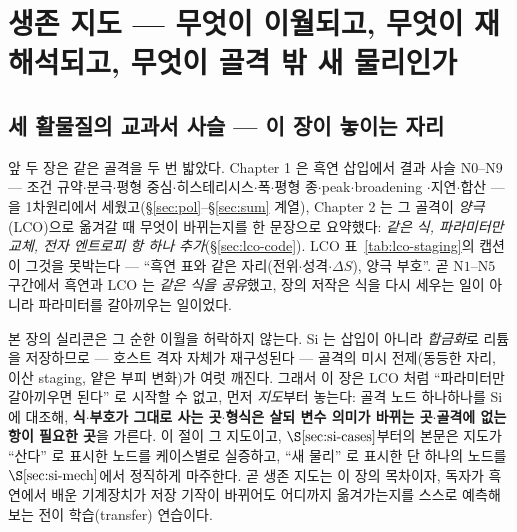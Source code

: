 \section{생존 지도 --- 무엇이 이월되고, 무엇이 재해석되고, 무엇이 골격 밖 새 물리인가}\label{sec:si-map}

\subsection{세 활물질의 교과서 사슬 --- 이 장이 놓이는 자리}\label{ssec:si-arc}
앞 두 장은 같은 골격을 두 번 밟았다. Chapter 1 은 흑연 삽입에서 결과 사슬 $\mathrm{N0}$--$\mathrm{N9}$
--- 조건 규약$\cdot$분극$\cdot$평형 중심$\cdot$히스테리시스$\cdot$폭$\cdot$평형 종$\cdot$peak$\cdot$broadening
$\cdot$지연$\cdot$합산 --- 을 1차원리에서 세웠고(\S\ref{sec:pol}--\S\ref{sec:sum} 계열), Chapter 2 는 그
골격이 \emph{양극}(LCO)으로 옮겨갈 때 무엇이 바뀌는지를 한 문장으로 요약했다: \emph{같은 식, 파라미터만
교체, 전자 엔트로피 항 하나 추가}(\S\ref{sec:lco-code}). LCO 표~\eqref{tab:lco-staging}의 캡션이
그것을 못박는다 --- ``흑연 표와 같은 자리(전위$\cdot$성격$\cdot\Delta S$), 양극 부호''. 곧 $\mathrm{N1}$--$\mathrm{N5}$
구간에서 흑연과 LCO 는 \emph{같은 식을 공유}했고, 장의 저작은 식을 다시 세우는 일이 아니라 파라미터를
갈아끼우는 일이었다.

본 장의 실리콘은 그 순한 이월을 허락하지 않는다. Si 는 삽입이 아니라 \emph{합금화}로 리튬을 저장하므로
--- 호스트 격자 자체가 재구성된다 --- 골격의 미시 전제(동등한 자리, 이산 staging, 얕은 부피 변화)가
여럿 깨진다. 그래서 이 장은 LCO 처럼 ``파라미터만 갈아끼우면 된다'' 로 시작할 수 없고, 먼저 \emph{지도}부터
놓는다: 골격 노드 하나하나를 Si 에 대조해, \textbf{식$\cdot$부호가 그대로 사는 곳}$\cdot$\textbf{형식은
살되 변수 의미가 바뀌는 곳}$\cdot$\textbf{골격에 없는 항이 필요한 곳}을 가른다. 이 절이 그 지도이고,
$\S\ref{sec:si-cases}$부터의 본문은 지도가 ``산다'' 로 표시한 노드를 케이스별로 실증하고, ``새 물리'' 로
표시한 단 하나의 노드를 $\S\ref{sec:si-mech}$에서 정직하게 마주한다. 곧 생존 지도는 이 장의 목차이자,
독자가 흑연에서 배운 기계장치가 저장 기작이 바뀌어도 어디까지 옮겨가는지를 스스로 예측해 보는 전이
학습(transfer) 연습이다.


